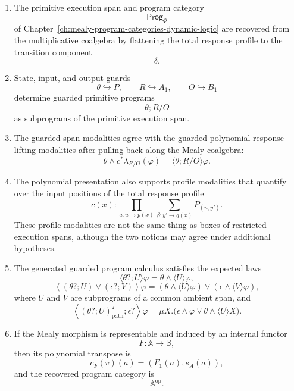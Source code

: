 \begin{theorem}
\begin{enumerate}
\item The primitive execution span and program category
\[
\mathsf{Prog}_\Phi
\]
of Chapter~\ref{ch:mealy-program-categories-dynamic-logic} are recovered
from the multiplicative coalgebra by flattening the total response profile
to the transition component
\[
\delta.
\]

\item State, input, and output guards
\[
\theta\hookrightarrow P,
\qquad
R\hookrightarrow A_1,
\qquad
O\hookrightarrow B_1
\]
determine guarded primitive programs
\[
\theta;R/O
\]
as subprograms of the primitive execution span.

\item The guarded span modalities agree with the guarded polynomial
response-lifting modalities after pulling back along the Mealy coalgebra:
\[
\theta\wedge c^\ast\lambda_{R/O}(\varphi)
=
\langle \theta;R/O\rangle\varphi.
\]

\item The polynomial presentation also supports profile modalities that
quantify over the input positions of the total response profile
\[
c(x):
\prod_{a:u\to p(x)}
\sum_{\beta:y'\to q(x)}
P_{(u,y')}.
\]
These profile modalities are not the same thing as boxes of restricted
execution spans, although the two notions may agree under additional
hypotheses.

\item The generated guarded program calculus satisfies the expected laws
\[
\langle \theta?;U\rangle\varphi
=
\theta\wedge\langle U\rangle\varphi,
\]
\[
\left\langle
(\theta?;U)\vee(\epsilon?;V)
\right\rangle\varphi
=
(\theta\wedge\langle U\rangle\varphi)
\vee
(\epsilon\wedge\langle V\rangle\varphi),
\]
where \(U\) and \(V\) are subprograms of a common ambient span, and
\[
\left\langle
(\theta?;U)^\star_{\mathrm{path}};\epsilon?
\right\rangle\varphi
=
\mu X.\bigl(
\epsilon\wedge\varphi
\vee
\theta\wedge\langle U\rangle X
\bigr).
\]

\item If the Mealy morphism is representable and induced by an internal
functor
\[
F:\mathbb A\to\mathbb B,
\]
then its polynomial transpose is
\[
c_F(v)(a)=(F_1(a),s_A(a)),
\]
and the recovered program category is
\[
\mathbb A^{\mathrm{op}}.
\]
\end{enumerate}
\end{theorem}

